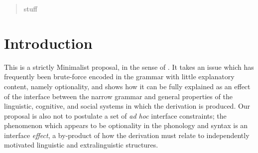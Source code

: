 \date{Received: date / Accepted: date}


\maketitle

\begin{abstract}
stuff
\end{abstract}

\section{Introduction}
\label{intro}

This is a strictly Minimalist proposal, in the sense of \citet{chomsky1993, chomsky1995, chomsky1998,chomsky2001}.
It takes an issue which has frequently been brute-force encoded in the grammar with little explanatory content, namely optionality, and shows how it can be fully explained as an effect of the interface between the narrow grammar and general properties of the linguistic, cognitive, and social systems in which the derivation is produced.
Our proposal is also not to postulate a set of \textsl{ad hoc} interface constraints; the phenomenon which appears to be optionality in the phonology and syntax is an interface \textsl{effect}, a by-product of how the derivation must relate to independently motivated linguistic and extralinguistic structures.

